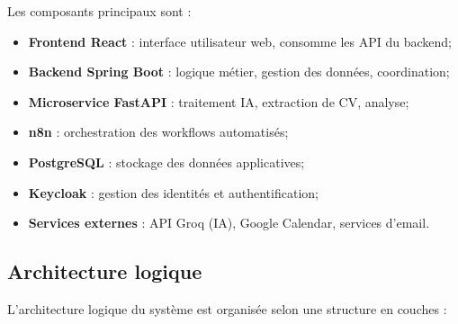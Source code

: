 Les composants principaux sont :

\begin{itemize}
    \item \textbf{Frontend React} : interface utilisateur web, consomme les API du backend;
    
    \item \textbf{Backend Spring Boot} : logique métier, gestion des données, coordination;
    
    \item \textbf{Microservice FastAPI} : traitement IA, extraction de CV, analyse;
    
    \item \textbf{n8n} : orchestration des workflows automatisés;
    
    \item \textbf{PostgreSQL} : stockage des données applicatives;
    
    \item \textbf{Keycloak} : gestion des identités et authentification;
    
    \item \textbf{Services externes} : API Groq (IA), Google Calendar, services d'email.
\end{itemize}


\subsection{Architecture logique}
\label{subsec:architecture-logique}

L'architecture logique du système est organisée selon une structure en couches :

